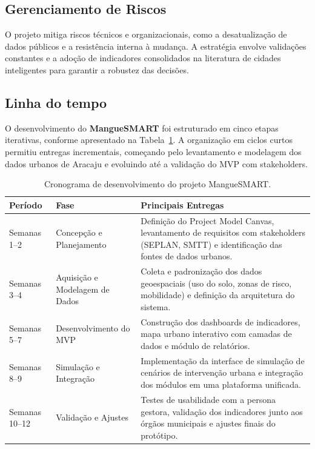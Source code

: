 \documentclass[12pt]{article}
\begin{document}
\subsection{Gerenciamento de Riscos}
O projeto mitiga riscos técnicos e organizacionais, como a desatualização de dados públicos e a resistência interna à mudança. A estratégia envolve validações constantes e a adoção de indicadores consolidados na literatura de cidades inteligentes \cite{iwasa2025} para garantir a robustez das decisões.

\subsection{Linha do tempo}

O desenvolvimento do \textbf{MangueSMART} foi estruturado em cinco etapas iterativas, conforme apresentado na Tabela~\ref{tab:cronograma}. A organização em ciclos curtos permitiu entregas incrementais, começando pelo levantamento e modelagem dos dados urbanos de Aracaju e evoluindo até a validação do MVP com stakeholders.

\begin{table}[H]
\centering
\caption{Cronograma de desenvolvimento do projeto MangueSMART.}
\label{tab:cronograma}
\begin{tabular}{@{}p{2.2cm} p{3cm} p{7cm}@{}}
\toprule
\textbf{Período} & \textbf{Fase} & \textbf{Principais Entregas} \\
\midrule
Semanas 1--2 & Concepção e Planejamento & Definição do Project Model Canvas, levantamento de requisitos com stakeholders (SEPLAN, SMTT) e identificação das fontes de dados urbanos. \\
Semanas 3--4 & Aquisição e Modelagem de Dados & Coleta e padronização dos dados geoespaciais (uso do solo, zonas de risco, mobilidade) e definição da arquitetura do sistema. \\
Semanas 5--7 & Desenvolvimento do MVP & Construção dos dashboards de indicadores, mapa urbano interativo com camadas de dados e módulo de relatórios. \\
Semanas 8--9 & Simulação e Integração & Implementação da interface de simulação de cenários de intervenção urbana e integração dos módulos em uma plataforma unificada. \\
Semanas 10--12 & Validação e Ajustes & Testes de usabilidade com a persona gestora, validação dos indicadores junto aos órgãos municipais e ajustes finais do protótipo. \\
\bottomrule
\end{tabular}
\end{table}
\end{document}
